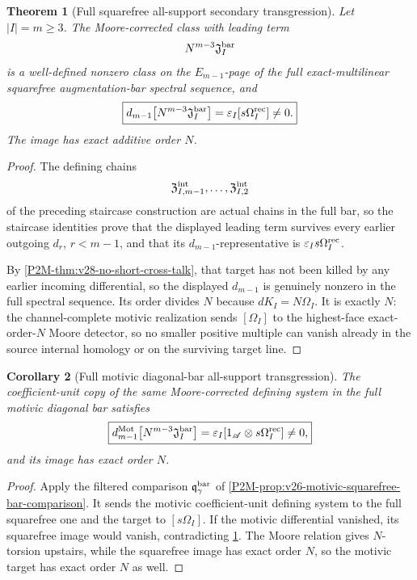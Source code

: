 \documentclass[11pt]{article}
\newtheorem{theorem}{Theorem}[section]
\newtheorem{corollary}[theorem]{Corollary}
\theoremstyle{remark}
\newcommand{\Mot}{\mathrm{Mot}}
\begin{document}
\begin{theorem}[Full squarefree all-support secondary transgression]
\label{P2M-thm:v28-full-squarefree-secondary-transgression}
Let \(|I|=m\ge3\).  The Moore-corrected class with leading term
\[
 N^{m-3}\mathfrak J_I^{\rm bar}
\]
is a well-defined nonzero class on the \(E_{m-1}\)-page of the
\emph{full} exact-multilinear squarefree augmentation-bar spectral sequence,
and
\begin{equation}
 \boxed{
 d_{m-1}
 \bigl[
   N^{m-3}\mathfrak J_I^{\rm bar}
 \bigr]
 =
 \varepsilon_I
 [s\Omega_I^{\rm rec}]
 \ne0.}
\end{equation}
The image has exact additive order \(N\).
\end{theorem}

\begin{proof}
The defining chains
\[
 \mathfrak Z_{I,m-1}^{\rm int},
 \ldots,
 \mathfrak Z_{I,2}^{\rm int}
\]
of the preceding staircase construction are actual chains in the full bar, so the staircase identities prove
that the displayed leading term survives every earlier outgoing
\(d_r\), \(r<m-1\), and that its \(d_{m-1}\)-representative is
\(\varepsilon_Is\Omega_I^{\rm rec}\).

By \cref{P2M-thm:v28-no-short-cross-talk}, that target has not been killed by any
earlier incoming differential, so the displayed \(d_{m-1}\) is genuinely
nonzero in the full spectral sequence.  Its order divides \(N\) because
\(dK_I=N\Omega_I\).  It is exactly \(N\): the channel-complete motivic
realization sends \([\Omega_I]\) to the highest-face exact-order-\(N\)
Moore detector, so no smaller positive multiple can vanish already in the
source internal homology or on the surviving target line.
\end{proof}

\begin{corollary}[Full motivic diagonal-bar all-support transgression]
\label{P2M-cor:v28-full-motivic-secondary-transgression}
The coefficient-unit copy of the same Moore-corrected defining system in the
full motivic diagonal bar satisfies
\begin{equation}
 \boxed{
 d_{m-1}^{\Mot}
 \bigl[
   N^{m-3}\mathfrak J_I^{\rm bar}
 \bigr]
 =
 \varepsilon_I
 [1_{\mathscr A}\otimes s\Omega_I^{\rm rec}]
 \ne0,}
\end{equation}
and its image has exact order \(N\).
\end{corollary}

\begin{proof}
Apply the filtered comparison
\(\mathfrak q_\gamma^{\rm bar}\) of
\cref{P2M-prop:v26-motivic-squarefree-bar-comparison}.  It sends the motivic
coefficient-unit defining system to the full squarefree one and the target to
\([s\Omega_I]\).  If the motivic differential vanished, its squarefree image
would vanish, contradicting
\cref{P2M-thm:v28-full-squarefree-secondary-transgression}.  The Moore relation
gives \(N\)-torsion upstairs, while the squarefree image has exact order \(N\),
so the motivic target has exact order \(N\) as well.
\end{proof}
\end{document}
